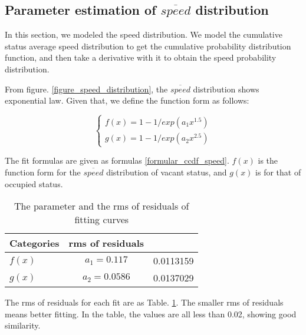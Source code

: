 \subsection{Parameter estimation of $\overline{speed}$ distribution}
\label{section_speed_modeling}
In this section, we modeled the speed distribution. We model the cumulative status average speed distribution to get the cumulative probability distribution function, and then take a derivative with it to obtain the speed probability distribution.

From figure. \ref{figure_speed_distribution}, the $\overline{speed}$ distribution shows exponential law. Given that, we define the function form as follows:

\begin{equation}\label{formular_ccdf_speed}
\left\{
\begin{array}{ll}
f(x) = 1-1/exp(a_1x^{1.5})\\
g(x) = 1-1/exp(a_2x^{2.5})
\end{array}
\right.
\end{equation}

The fit formulas are given as formulas \ref{formular_ccdf_speed}. $f(x)$ is the function form for the $\overline{speed}$ distribution of vacant status, and $g(x)$ is for that of occupied status.

\begin{table}[!h]
\caption{The parameter and the rms of residuals of fitting curves}\label{table_rms}
\centering
\begin{tabular}{l|c|c}
  \hline
  Categories & rms of residuals  \\
  \hline
  $f(x)$ &$a_1=0.117$ &0.0113159\\
  $g(x)$ &$a_2=0.0586$ &0.0137029\\
  \hline
\end{tabular}
\end{table}

The rms of residuals for each fit are as Table. \ref{table_rms}. The smaller rms of residuals means better fitting.
In the table, the values are all less than 0.02, showing good similarity.


